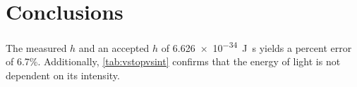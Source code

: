 \documentclass{article}
\begin{document}
\begin{figure}
    \centering
    \def\svgwidth{\linewidth}
    
    \caption{}
    \label{fig:vvsi}
\end{figure}

\section{Conclusions}
The measured $h$ and an accepted $h$ of \qty{6.626e-34}{J.s} yields a percent error of 6.7\%. Additionally, \autoref{tab:vstopvsint} confirms that the energy of light is not dependent on its intensity.
\end{document}
